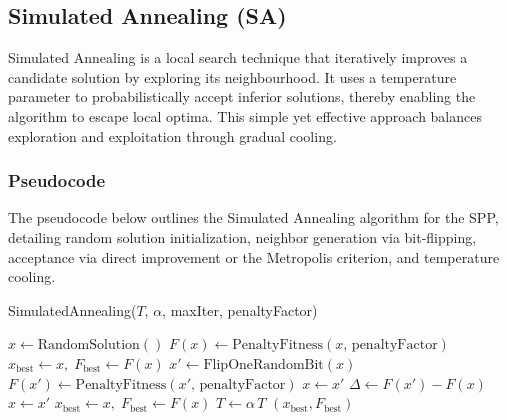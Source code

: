 \documentclass[12pt]{article}
\begin{document}
\subsection{Simulated Annealing (SA)}
Simulated Annealing is a local search technique that iteratively improves a candidate solution by exploring its neighbourhood. It uses a temperature parameter to probabilistically accept inferior solutions, thereby enabling the algorithm to escape local optima. This simple yet effective approach balances exploration and exploitation through gradual cooling.

\subsubsection{Pseudocode}
The pseudocode below outlines the Simulated Annealing algorithm for the SPP, detailing random solution initialization, neighbor generation via bit-flipping, acceptance via direct improvement or the Metropolis criterion, and temperature cooling.
\begin{algorithm}[htbp]
  \caption{SimulatedAnnealing(\(T\), \(\alpha\), maxIter, penaltyFactor)}
  \begin{algorithmic}[1]
    \State \(x \gets \text{RandomSolution}()\) 
    \State \(F(x) \gets \text{PenaltyFitness}(x,\,\text{penaltyFactor})\)
    \State \(x_{\text{best}} \gets x,\; F_{\text{best}} \gets F(x)\)
      \State \(x' \gets \text{FlipOneRandomBit}(x)\) 
      \State \(F(x') \gets \text{PenaltyFitness}(x',\,\text{penaltyFactor})\)
        \State \(x \gets x'\) 
      \Else
        \State \(\Delta \gets F(x') - F(x)\)
          \State \(x \gets x'\) 
        \EndIf
      \EndIf
        \State \(x_{\text{best}} \gets x,\; F_{\text{best}} \gets F(x)\) 
      \EndIf
      \State \(T \gets \alpha \, T\) 
    \EndFor
    \State \Return \((x_{\text{best}}, F_{\text{best}})\)
  \end{algorithmic}
  \end{algorithm}
\end{document}
